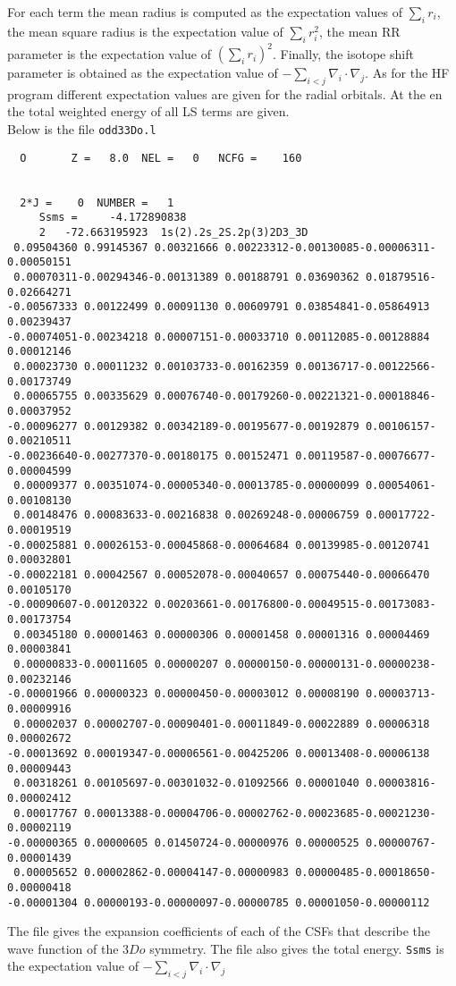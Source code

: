 \documentclass[fleqn,10pt]{book}
\begin{document}
For each term the mean radius is computed as the expectation values of $\sum_i r_i$, the mean square radius is the expectation value of $\sum_i r^ 2_i$, the mean RR
parameter is the expectation value of $( \sum_i r_i)^2$. Finally, the isotope shift parameter is obtained as the
expectation value of $ - \sum_{i< j} \nabla_i \cdot \nabla_j$. As for the HF program different expectation values are given for the radial orbitals. At the en the total weighted energy of all LS terms are given.\medskip\\
Below is the file \verb+odd33Do.l+
\begin{verbatim}
  O       Z =   8.0  NEL =   0   NCFG =    160                                                                                                                                                


  2*J =    0  NUMBER =   1   
     Ssms =     -4.172890838
     2   -72.663195923  1s(2).2s_2S.2p(3)2D3_3D
 0.09504360 0.99145367 0.00321666 0.00223312-0.00130085-0.00006311-0.00050151
 0.00070311-0.00294346-0.00131389 0.00188791 0.03690362 0.01879516-0.02664271
-0.00567333 0.00122499 0.00091130 0.00609791 0.03854841-0.05864913 0.00239437
-0.00074051-0.00234218 0.00007151-0.00033710 0.00112085-0.00128884 0.00012146
 0.00023730 0.00011232 0.00103733-0.00162359 0.00136717-0.00122566-0.00173749
 0.00065755 0.00335629 0.00076740-0.00179260-0.00221321-0.00018846-0.00037952
-0.00096277 0.00129382 0.00342189-0.00195677-0.00192879 0.00106157-0.00210511
-0.00236640-0.00277370-0.00180175 0.00152471 0.00119587-0.00076677-0.00004599
 0.00009377 0.00351074-0.00005340-0.00013785-0.00000099 0.00054061-0.00108130
 0.00148476 0.00083633-0.00216838 0.00269248-0.00006759 0.00017722-0.00019519
-0.00025881 0.00026153-0.00045868-0.00064684 0.00139985-0.00120741 0.00032801
-0.00022181 0.00042567 0.00052078-0.00040657 0.00075440-0.00066470 0.00105170
-0.00090607-0.00120322 0.00203661-0.00176800-0.00049515-0.00173083-0.00173754
 0.00345180 0.00001463 0.00000306 0.00001458 0.00001316 0.00004469 0.00003841
 0.00000833-0.00011605 0.00000207 0.00000150-0.00000131-0.00000238-0.00232146
-0.00001966 0.00000323 0.00000450-0.00003012 0.00008190 0.00003713-0.00009916
 0.00002037 0.00002707-0.00090401-0.00011849-0.00022889 0.00006318 0.00002672
-0.00013692 0.00019347-0.00006561-0.00425206 0.00013408-0.00006138 0.00009443
 0.00318261 0.00105697-0.00301032-0.01092566 0.00001040 0.00003816-0.00002412
 0.00017767 0.00013388-0.00004706-0.00002762-0.00023685-0.00021230-0.00002119
-0.00000365 0.00000605 0.01450724-0.00000976 0.00000525 0.00000767-0.00001439
 0.00005652 0.00002862-0.00004147-0.00000983 0.00000485-0.00018650-0.00000418
-0.00001304 0.00000193-0.00000097-0.00000785 0.00001050-0.00000112
\end{verbatim}
The file gives the expansion coefficients of each of the CSFs that describe the wave function of the $3Do$ symmetry.
The file also gives the total energy. \verb+Ssms+ is the expectation value of $ - \sum_{i< j} \nabla_i \cdot \nabla_j$            
\end{document}
